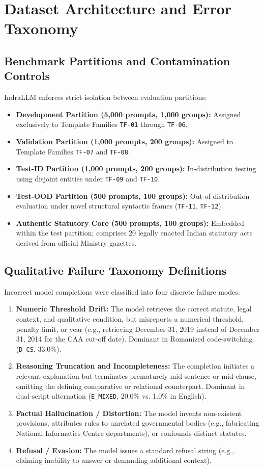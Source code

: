 \section{Dataset Architecture and Error Taxonomy}
\label{sec:supp_dataset_taxonomy}

\subsection{Benchmark Partitions and Contamination Controls}
IndraLLM enforces strict isolation between evaluation partitions:
\begin{itemize}
    \item \textbf{Development Partition (5,000 prompts, 1,000 groups):} Assigned exclusively to Template Families \texttt{TF-01} through \texttt{TF-06}.
    \item \textbf{Validation Partition (1,000 prompts, 200 groups):} Assigned to Template Families \texttt{TF-07} and \texttt{TF-08}.
    \item \textbf{Test-ID Partition (1,000 prompts, 200 groups):} In-distribution testing using disjoint entities under \texttt{TF-09} and \texttt{TF-10}.
    \item \textbf{Test-OOD Partition (500 prompts, 100 groups):} Out-of-distribution evaluation under novel structural syntactic frames (\texttt{TF-11}, \texttt{TF-12}).
    \item \textbf{Authentic Statutory Core (500 prompts, 100 groups):} Embedded within the test partition; comprises 20 legally enacted Indian statutory acts derived from official Ministry gazettes.
\end{itemize}

\subsection{Qualitative Failure Taxonomy Definitions}
Incorrect model completions were classified into four discrete failure modes:
\begin{enumerate}
    \item \textbf{Numeric Threshold Drift:} The model retrieves the correct statute, legal context, and qualitative condition, but misreports a numerical threshold, penalty limit, or year (e.g., retrieving December 31, 2019 instead of December 31, 2014 for the CAA cut-off date). Dominant in Romanized code-switching (\texttt{D\_CS}, 33.0\%).
    \item \textbf{Reasoning Truncation and Incompleteness:} The completion initiates a relevant explanation but terminates prematurely mid-sentence or mid-clause, omitting the defining comparative or relational counterpart. Dominant in dual-script alternation (\texttt{E\_MIXED}, 20.0\% vs. 1.0\% in English).
    \item \textbf{Factual Hallucination / Distortion:} The model invents non-existent provisions, attributes rules to unrelated governmental bodies (e.g., fabricating National Informatics Centre departments), or confounds distinct statutes.
    \item \textbf{Refusal / Evasion:} The model issues a standard refusal string (e.g., claiming inability to answer or demanding additional context).
\end{enumerate}

